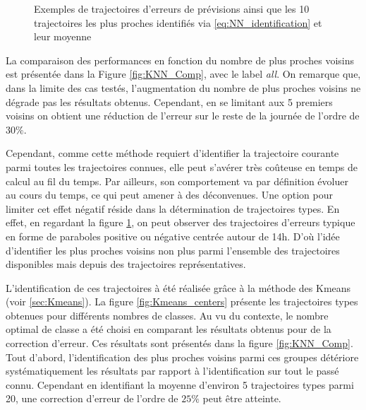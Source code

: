 \documentclass[12pt]{report}
\begin{document}
\begin{figure}[htbp]
\begin{subfigure}[b]{0.5\linewidth}
	\end{subfigure}%
	
	\caption{Exemples de trajectoires d'erreurs de prévisions ainsi que les 10 trajectoires les plus proches identifiés via \eqref{eq:NN_identification} et leur moyenne}
	\label{fig:KNN_Intraday_scenarios} 
\end{figure}


La comparaison des performances en fonction du nombre de plus proches voisins est présentée dans la Figure \ref{fig:KNN_Comp}, avec le label \textit{all}. On remarque que, dans la limite des cas testés, l'augmentation du nombre de plus proches voisins ne dégrade pas les résultats obtenus. Cependant, en se limitant aux 5 premiers voisins on obtient une réduction de l'erreur sur le reste de la journée de l'ordre de $30\%$.

Cependant, comme cette méthode requiert d'identifier la trajectoire courante parmi toutes les trajectoires connues, elle peut s'avérer très coûteuse en temps de calcul au fil du temps. Par ailleurs, son comportement va par définition évoluer au cours du temps, ce qui peut amener à des déconvenues. Une option pour limiter cet effet négatif réside dans la détermination de trajectoires types. En effet, en regardant la figure \ref{fig:KNN_Intraday_scenarios}, on peut observer des trajectoires d'erreurs typique en forme de paraboles positive ou négative centrée autour de 14h. D'où l'idée d'identifier les plus proches voisins non plus parmi l'ensemble des trajectoires disponibles mais depuis des trajectoires représentatives.

L'identification de ces trajectoires à été réalisée grâce à la méthode des Kmeans (voir \ref{sec:Kmeans}). La figure \ref{fig:Kmeans_centers} présente les trajectoires types obtenues pour différents nombres de classes. Au vu du contexte, le nombre optimal de classe a été choisi en comparant les résultats obtenus pour de la correction d'erreur. Ces résultats sont présentés dans la figure \ref{fig:KNN_Comp}. Tout d'abord, l'identification des plus proches voisins parmi ces groupes détériore systématiquement les résultats par rapport à l'identification sur tout le passé connu. Cependant en identifiant la moyenne d'environ 5 trajectoires types parmi 20, une correction d'erreur de l'ordre de $25 \%$ peut être atteinte.
\end{document}
